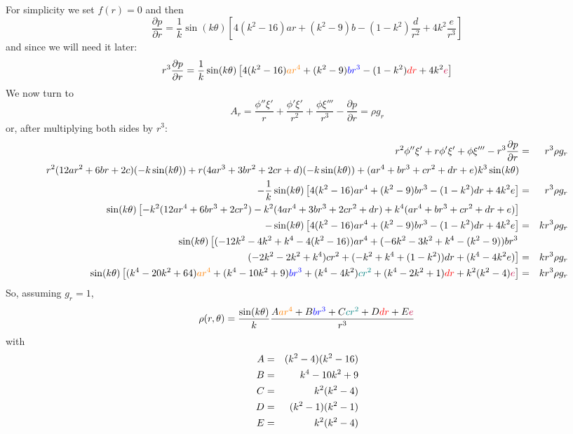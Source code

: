 For simplicity we set $f(r)=0$ and then
\[
\frac{\partial p}{\partial r}
=
\frac{1}{k}\sin(k\theta) 
\left[
4(k^2-16)ar
+(k^2-9)b
-(1-k^2)\frac{d}{r^2}
+4k^2\frac{e}{r^3}
\right]
\]
and since we will need it later:
\[
r^3 \frac{\partial p}{\partial r}
=
\frac{1}{k}\sin(k\theta) 
\left[
4(k^2-16) {\color{orange}ar^4}
+(k^2-9) {\color{blue} b r^3}
-(1-k^2) {\color{red} dr}
+4k^2 {\color{purple} e}
\right]
\]
We now turn to
\[
A_r= \frac{\phi'' \xi'}{r} + \frac{\phi' \xi'}{r^2} + \frac{\phi\xi''' }{r^3}
-\frac{\partial p}{\partial r} = \rho g_r
\]
or, after multiplying both sides by $r^3$:
\begin{eqnarray}
r^2  \phi'' \xi' 
+ r \phi' \xi'  
+ \phi\xi''' 
- r^3\frac{\partial p}{\partial r} &=& r^3\rho g_r \nonumber\\
r^2( 12 ar^2 + 6 br + 2c) (-k \sin (k\theta))
+ r (4ar^3+3br^2 +2cr + d) (-k \sin (k\theta))
+ ( ar^4+br^3+cr^2+dr+e) k^3 \sin (k\theta)  && \nonumber\\
-\frac{1}{k}\sin(k\theta) 
\left[
4(k^2-16)ar^4
+(k^2-9)b r^3
-(1-k^2)dr
+4k^2e
\right]
 &=& r^3\rho g_r \nonumber\\
\sin(k\theta)
\left[-k^2( 12 ar^4 + 6 br^3 + 2cr^2)
-k^2  (4ar^4+3br^3 +2cr^2 + dr) 
+k^4 ( ar^4+br^3+cr^2+dr+e)  \right]  && \nonumber\\
-\sin(k\theta) 
\left[
4(k^2-16)ar^4
+(k^2-9)b r^3
-(1-k^2)dr
+4k^2e
\right]
&=& k r^3\rho g_r \nonumber\\
\sin(k\theta)
\left[
(-12k^2-4k^2+k^4-4(k^2-16) )ar^4+
(-6k^2-3k^2+k^4 -(k^2-9))br^3  \right. && \nonumber\\
\left.
(-2k^2-2k^2+k^4 )cr^2+
(-k^2+k^4+(1-k^2) )dr+
(k^4-4k^2e )
\right] &=& k r^3\rho g_r \nonumber\\
\sin(k\theta)
\left[
(k^4-20k^2+64) {\color{orange} ar^4}+
(k^4-10k^2+9) {\color{blue} br^3}  
+(k^4-4k^2) {\color{teal}c r^2}
+(k^4-2k^2+1) {\color{red}dr}+
k^2(k^2-4) {\color{purple}e}
\right] &=& k r^3\rho g_r \nonumber
\end{eqnarray}
So, assuming $g_r=1$, 
\[
\rho(r,\theta)=\frac{\sin(k\theta)}{k}
\frac{
A{\color{orange} ar^4}
+B{\color{blue} br^3}
+C {\color{teal}c r^2}
+D {\color{red}dr}
+E {\color{purple}e}
}{r^3}
\]
with 
\begin{eqnarray}
A &=& (k^2-4)(k^2-16)\nonumber \\
B &=& k^4-10k^2+9\nonumber    \\
C &=& k^2(k^2-4)  \nonumber    \\
D &=& (k^2-1)(k^2-1) \nonumber     \\
E &=& k^2(k^2-4)
\end{eqnarray}

